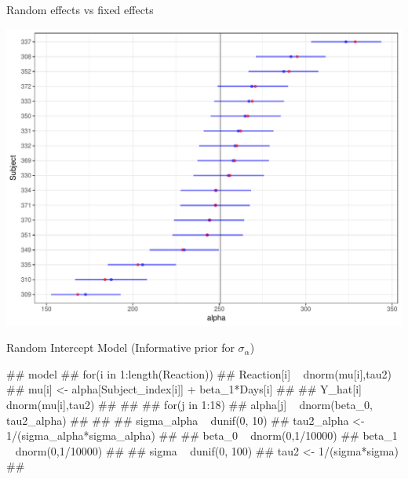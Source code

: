 \documentclass[11pt,ignorenonframetext,]{beamer}
\let\oldverbatim\verbatim
\let\endoldverbatim\endverbatim
\renewenvironment{verbatim}{\footnotesize\begin{spacing}{0.9}\oldverbatim}{\endoldverbatim\end{spacing}}
\begin{document}
\begin{frame}{Random effects vs fixed effects}

\includegraphics{Lec5_files/figure-beamer/unnamed-chunk-25-1.pdf}

\end{frame}

\begin{frame}[fragile]{Random Intercept Model (Informative prior for
\(\sigma_\alpha\))}

\begin{verbatim}
## model{
##   for(i in 1:length(Reaction)) {
##     Reaction[i] ~ dnorm(mu[i],tau2)
##     mu[i] <- alpha[Subject_index[i]] + beta_1*Days[i]
## 
##     Y_hat[i] ~ dnorm(mu[i],tau2)
##   }
## 
##   for(j in 1:18) {
##     alpha[j] ~ dnorm(beta_0, tau2_alpha)
##   }
##   
##   sigma_alpha ~ dunif(0, 10) 
##   tau2_alpha <- 1/(sigma_alpha*sigma_alpha)
## 
##   beta_0 ~ dnorm(0,1/10000)
##   beta_1 ~ dnorm(0,1/10000)
## 
##   sigma ~ dunif(0, 100) 
##   tau2 <- 1/(sigma*sigma)
## }
\end{verbatim}

\end{frame}
\end{document}
